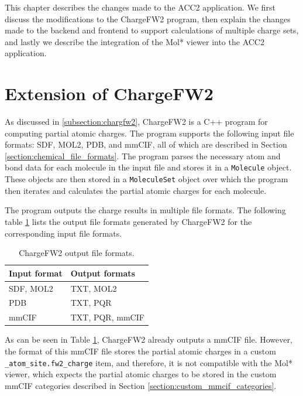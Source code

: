 \documentclass[
  digital,     %
  oneside,     %
  nosansbold,  %
  nocolorbold, %
  lof,         %
  lot,         %
]{fithesis4}
\begin{document}
This chapter describes the changes made to the ACC2 application. We first discuss the modifications to the ChargeFW2 program, then explain the changes made to the backend and frontend to support calculations of multiple charge sets, and lastly we describe the integration of the Mol* viewer into the ACC2 application.

\section{Extension of ChargeFW2}
\label{section:chargefw2_extension}

As discussed in \ref{subsection:chargfw2}, ChargeFW2 is a C++ program for computing partial atomic charges. The program supports the following input file formats: SDF, MOL2, PDB, and mmCIF, all of which are described in Section \ref{section:chemical_file_formats}. The program parses the necessary atom and bond data for each molecule in the input file and stores it in a \texttt{Molecule} object. These objects are then stored in a \texttt{MoleculeSet} object over which the program then iterates and calculates the partial atomic charges for each molecule.

The program outputs the charge results in multiple file formats. The following table \ref{table:chargefw2_output_formats} lists the output file formats generated by ChargeFW2 for the corresponding input file formats.

\begin{table}[htbp]
  \centering
  \begin{tabular}{|l|l|}
    \hline
    \textbf{Input format} & \textbf{Output formats} \\
    \hline
    SDF, MOL2 & TXT, MOL2 \\
    \hline
    PDB & TXT, PQR \\
    \hline
    mmCIF & TXT, PQR, mmCIF \\
    \hline
  \end{tabular}
  \caption{ChargeFW2 output file formats.}
  \label{table:chargefw2_output_formats}
\end{table}

As can be seen in Table \ref{table:chargefw2_output_formats}, ChargeFW2 already outputs a mmCIF file. However, the format of this mmCIF file stores the partial atomic charges in a custom \texttt{\_atom\_site.fw2\_charge} item, and therefore, it is not compatible with the Mol* viewer, which expects the partial atomic charges to be stored in the custom mmCIF categories described in Section \ref{section:custom_mmcif_categories}.
\end{document}
